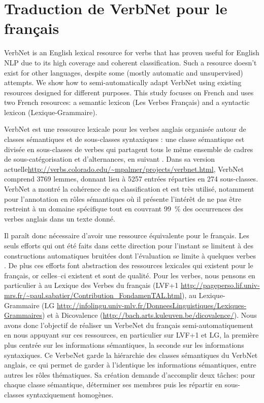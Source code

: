 \chapter{Traduction de VerbNet pour le français}
\label{ch:verbnet}

VerbNet is an English lexical resource for verbs that has proven useful for
English NLP due to its high coverage and coherent classification.  Such a
resource doesn't exist for other languages, despite some (mostly automatic and
unsupervised) attempts. We show how to semi-automatically adapt VerbNet using
existing resources designed for different purposes. This study focuses on
French and uses two French resources: a semantic lexicon (Les Verbes Français)
and a syntactic lexicon (Lexique-Grammaire).


VerbNet est une ressource lexicale pour les verbes anglais organisée autour de
classes sémantiques et de sous-classes syntaxiques : une classe sémantique est
divisée en sous-classes de verbes qui partagent tous le même ensemble de cadres
de sous-catégorisation et d'alternances, en suivant \cite{levin1993english}.
Dans sa version
actuelle\url{http://verbs.colorado.edu/~mpalmer/projects/verbnet.html}, VerbNet
comprend 3769 lemmes, donnant lieu à 5257 entrées réparties en 274
sous-classes. VerbNet a montré la cohérence de sa classification et est très
utilisé, notamment pour l'annotation en rôles sémantiques
\citep{swier2005exploiting, palmer2013semantic} où il présente l'intérêt de ne
pas être restreint à un domaine spécifique tout en couvrant 99~\% des
occurrences des verbes anglais dans un texte donné.

Il paraît donc nécessaire d'avoir une ressource équivalente pour le français.
Les seuls efforts qui ont été faits dans cette direction pour l'instant se
limitent à des constructions automatiques bruitées dont l'évaluation se limite
à quelques verbes \citep{messiant2010acquisition,falk2012classifying}. De plus
ces efforts font abstraction des ressources lexicales qui existent pour le
français, or celles–ci existent et sont de qualité. Pour les verbes, nous
pensons en particulier à au Lexique des Verbes du français (LVF+1
\url{http://pageperso.lif.univ-mrs.fr/~paul.sabatier/Contribution_FondamenTAL.html}),
au Lexique-Grammaire (LG
\url{http://infolingu.univ-mlv.fr/DonneesLinguistiques/Lexiques-Grammaires}) et
à Dicovalence (\url{http://bach.arts.kuleuven.be/dicovalence/}). Nous avons
donc l'objectif de réaliser un VerbeNet du français semi-automatiquement en
nous appuyant sur ces ressources, en particulier sur LVF+1 et LG, la première
plus centrée sur les informations sémantiques, la seconde sur les informations
syntaxiques. Ce VerbeNet garde la hiérarchie des classes sémantiques du VerbNet
anglais, ce qui permet de garder à l'identique les informations sémantiques,
entre autres les rôles thématiques. Sa création demande d'accomplir deux
tâches: pour chaque classe sémantique, déterminer ses membres puis les répartir
en sous-classes syntaxiquement homogènes.

